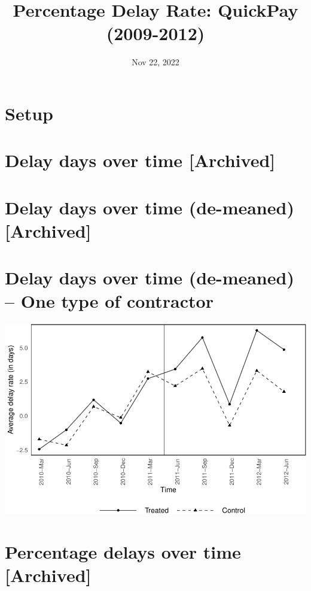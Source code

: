 \documentclass[
]{article}
\title{Percentage Delay Rate: QuickPay (2009-2012)}
\author{}
\date{\vspace{-2.5em}Nov 22, 2022}
\begin{document}
\maketitle

\hypertarget{setup}{%
\section{Setup}\label{setup}}

\hypertarget{delay-days-over-time-archived}{%
\section{Delay days over time
{[}Archived{]}}\label{delay-days-over-time-archived}}

\hypertarget{delay-days-over-time-de-meaned-archived}{%
\section{Delay days over time (de-meaned)
{[}Archived{]}}\label{delay-days-over-time-de-meaned-archived}}

\hypertarget{delay-days-over-time-de-meaned-one-type-of-contractor}{%
\section{Delay days over time (de-meaned) -- One type of
contractor}\label{delay-days-over-time-de-meaned-one-type-of-contractor}}

\includegraphics{qp_first_pc_delay-2_files/figure-latex/demeaned_plot_delay_days_one_type-1.pdf}

\hypertarget{percentage-delays-over-time-archived}{%
\section{Percentage delays over time
{[}Archived{]}}\label{percentage-delays-over-time-archived}}
\end{document}
